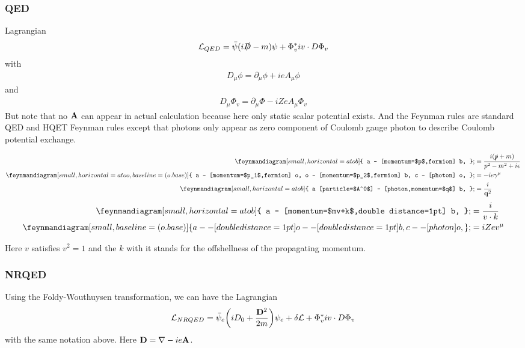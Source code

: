 \documentclass{article}
\newcommand{\gm}{\gamma^{\mu}}
\newcommand{\lag}{\mathcal{L}}
\begin{document}
\subsubsection{QED}
Lagrangian
\begin{align}
	\lag_{QED}=\bar\psi(i\slashed D-m)\psi+\Phi_v^*iv\cdot D\Phi_v
	\label{SQEDLAG}
\end{align}
with
\begin{align*}
	D_{\mu}\phi=\partial_{\mu}\phi+ieA_{\mu}\phi
\end{align*}
and
\begin{align*}
	D_{\mu}\Phi_v=\partial_{\mu}\Phi-iZeA_{\mu}\Phi_v
\end{align*}
But note that no $\vb{A}$ can appear in actual calculation because here only static scalar potential exists.
And the Feynman rules are standard QED and HQET Feynman rules except that photons only appear as zero component of Coulomb gauge photon to describe Coulomb potential exchange.
\begin{multicols}{2}
	\begin{align*}
		\feynmandiagram[small,horizontal=a to b]{
		a -- [momentum=$p$,fermion] b,
		}; & =\frac{i(\slashed p +m)}{p^2-m^2+i\epsilon} \\
		\feynmandiagram[small,horizontal=a to o,baseline=(o.base)]{
		a -- [momentum=$p_1$,fermion] o,
		o -- [momentum=$p_2$,fermion] b,
		c -- [photon] o,
		}; & =-ie\gm                                     \\
		\feynmandiagram[small,horizontal=a to b]{
		a [particle=$A^0$] -- [photon,momentum=$q$] b,
		}; & =\frac{i}{\vb{q}^2}
	\end{align*}
	\begin{align*}
		\feynmandiagram[small,horizontal=a to b]{
		a -- [momentum=$mv+k$,double distance=1pt] b,
		}; & =\frac{i}{v\cdot k} \\
		\feynmandiagram[small,baseline=(o.base)]{
		a -- [double distance=1pt] o -- [double distance=1pt] b,
		c -- [photon] o,
		}; & =iZev^{\mu}
	\end{align*}
\end{multicols}
Here $v$ satisfies $v^2=1$ and the $k$ with it stands for the offshellness of the propagating momentum.
\subsubsection{NRQED}
Using the Foldy-Wouthuysen transformation, we can have the Lagrangian
\begin{align}
	\lag_{NRQED}=\bar\psi_e\pqty{iD_0+\frac{\vb{D}^2}{2m}}\psi_e+\delta\lag +\Phi_v^*iv\cdot D\Phi_v
	\label{NRSQEDLAG}
\end{align}
with the same notation above. Here $\vb{D}=\nabla-ie\vb{A}$.
\end{document}
